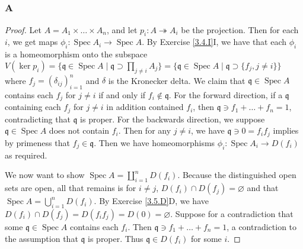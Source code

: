 \documentclass{article}
\newcommand{\frkq}{\mathfrak{q}}
\DeclareMathOperator{\Spec}{\mathrm{Spec}}
\let\emptyset\varnothing
\begin{document}
\subsection{}
\subsubsection{A}\label{3.6.A}
\begin{proof}
    Let $A=A_1\times \dots \times A_n$, and let $p_i:A\twoheadrightarrow A_i$ be the projection. Then for each $i$, we get maps $\phi_i:\Spec A_i \to \Spec A$. By Exercise \ref{3.4.I}I, we have that each $\phi_i$ is a homeomorphism onto the subspace $V( \ker p_i) = \{\frkq \in \Spec A \mid \frkq \supset \prod_{j\ne i} A_j \}=\{\frkq \in \Spec A \mid \frkq \supset \{f_j, j\ne i\} \}$ where $f_j=(\delta_{ij})_{i=1}^n$ and $\delta$ is the Kronecker delta. We claim that $\frkq \in \Spec A$ contains each $f_j$ for $j\ne i$ if and only if $f_i \notin \frkq$. For the forward direction, if a $\frkq$ containing each $f_j$ for $j\ne i$ in addition contained $f_i$, then $\frkq \ni f_1+\dots+f_n =1$, contradicting that $\frkq$ is proper. For the backwards direction, we suppose $\frkq \in \Spec A$ does not contain $f_i$. Then for any $j\ne i$, we have $\frkq \ni 0 = f_i f_j$ implies by primeness that $f_j \in \frkq$. Then we have homeomorphisms $\phi_i:\Spec A_i\to D(f_i)$ as required.

    We now want to show $\Spec A = \coprod_{i=1}^n D(f_i)$. Because the distinguished open sets are open, all that remains is for $i\ne j$, $D(f_i)\cap D(f_j)=\emptyset$ and that $\Spec A = \bigcup_{i=1}^n D(f_i)$. By Exercise \ref{3.5.D}D, we have $D(f_i)\cap D(f_j)=D(f_if_j)=D(0)=\emptyset$. Suppose for a contradiction that some $\frkq \in \Spec A$ contains each $f_i$. Then $\frkq \ni f_1+\dots+f_n = 1$, a contradiction to the assumption that $\frkq$ is proper. Thus $\frkq \in D(f_i)$ for some $i$.
\end{proof}
\end{document}

